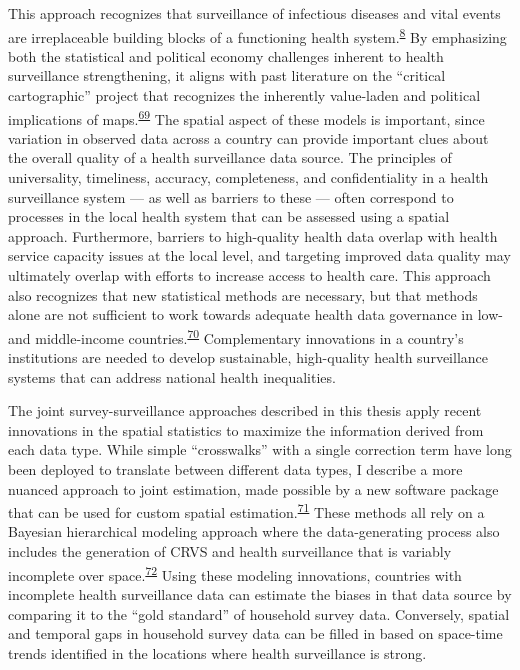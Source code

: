 \documentclass[
]{article}
\begin{document}
This approach recognizes that surveillance of infectious diseases and vital events are irreplaceable building blocks of a functioning health system.\textsuperscript{\protect\hyperlink{ref-Roberts2008}{8}} By emphasizing both the statistical and political economy challenges inherent to health surveillance strengthening, it aligns with past literature on the ``critical cartographic'' project that recognizes the inherently value-laden and political implications of maps.\textsuperscript{\protect\hyperlink{ref-Crampton2006}{69}} The spatial aspect of these models is important, since variation in observed data across a country can provide important clues about the overall quality of a health surveillance data source. The principles of universality, timeliness, accuracy, completeness, and confidentiality in a health surveillance system --- as well as barriers to these --- often correspond to processes in the local health system that can be assessed using a spatial approach. Furthermore, barriers to high-quality health data overlap with health service capacity issues at the local level, and targeting improved data quality may ultimately overlap with efforts to increase access to health care. This approach also recognizes that new statistical methods are necessary, but that methods alone are not sufficient to work towards adequate health data governance in low- and middle-income countries.\textsuperscript{\protect\hyperlink{ref-Tiffin2019}{70}} Complementary innovations in a country's institutions are needed to develop sustainable, high-quality health surveillance systems that can address national health inequalities.

The joint survey-surveillance approaches described in this thesis apply recent innovations in the spatial statistics to maximize the information derived from each data type. While simple ``crosswalks'' with a single correction term have long been deployed to translate between different data types, I describe a more nuanced approach to joint estimation, made possible by a new software package that can be used for custom spatial estimation.\textsuperscript{\protect\hyperlink{ref-Osgood-Zimmerman2021}{71}} These methods all rely on a Bayesian hierarchical modeling approach where the data-generating process also includes the generation of CRVS and health surveillance that is variably incomplete over space.\textsuperscript{\protect\hyperlink{ref-Schmertmann2018}{72}} Using these modeling innovations, countries with incomplete health surveillance data can estimate the biases in that data source by comparing it to the ``gold standard'' of household survey data. Conversely, spatial and temporal gaps in household survey data can be filled in based on space-time trends identified in the locations where health surveillance is strong.
\end{document}
